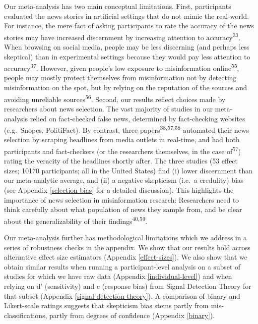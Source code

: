 \documentclass[
  doc,floatsintext]{apa6}
\begin{document}
Our meta-analysis has two main conceptual limitations. First, participants evaluated the news stories in artificial settings that do not mimic the real-world. For instance, the mere fact of asking participants to rate the accuracy of the news stories may have increased discernment by increasing attention to accuracy\textsuperscript{33}. When browsing on social media, people may be less discerning (and perhaps less skeptical) than in experimental settings because they would pay less attention to accuracy\textsuperscript{37}. However, given people's low exposure to misinformation online\textsuperscript{55}, people may mostly protect themselves from misinformation not by detecting misinformation on the spot, but by relying on the reputation of the sources and avoiding unreliable sources\textsuperscript{56}. Second, our results reflect choices made by researchers about news selection. The vast majority of studies in our meta-analysis relied on fact-checked false news, determined by fact-checking websites (e.g.~Snopes, PolitiFact). By contrast, three papers\textsuperscript{38,57,58} automated their news selection by scraping headlines from media outlets in real-time, and had both participants and fact-checkers (or the researchers themselves, in the case of\textsuperscript{57}) rating the veracity of the headlines shortly after. The three studies (53 effect sizes; 10170 participants; all in the United States) find (i) lower discernment than our meta-analytic average, and (ii) a negative skepticism (i.e.~a credulity) bias (see Appendix \ref{selection-bias} for a detailed discussion). This highlights the importance of news selection in misinformation research: Researchers need to think carefully about what population of news they sample from, and be clear about the generalizability of their findings\textsuperscript{40,59}.

Our meta-analysis further has methodological limitations which we address in a series of robustness checks in the appendix. We show that our results hold across alternative effect size estimators (Appendix \ref{effect-sizes}). We also show that we obtain similar results when running a participant-level analysis on a subset of studies for which we have raw data (Appendix \ref{individual-level}) and when relying on d' (sensitivity) and c (response bias) from Signal Detection Theory for that subset (Appendix \ref{signal-detection-theory}). A comparison of binary and Likert-scale ratings suggests that skepticism bias stems partly from mis-classifications, partly from degrees of confidence (Appendix \ref{binary}).
\end{document}
